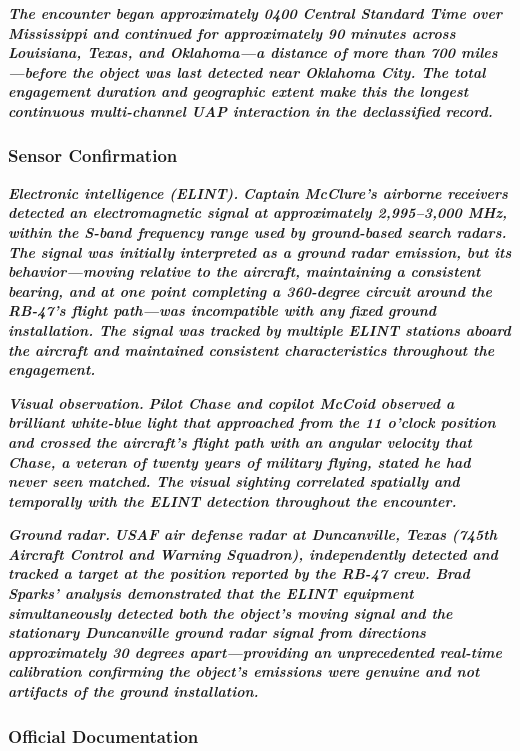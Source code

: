 \documentclass[11pt,letterpaper]{article}
\begin{document}
\textbf{\textit{The encounter began approximately 0400 Central Standard Time over Mississippi and continued for approximately 90 minutes across Louisiana, Texas, and Oklahoma---a distance of more than 700 miles---before the object was last detected near Oklahoma City. The total engagement duration and geographic extent make this the longest continuous multi-channel UAP interaction in the declassified record.}}


\subsubsection{Sensor Confirmation}

\textbf{\textit{Electronic intelligence (ELINT).}}\textbf{\textit{ Captain McClure's airborne receivers detected an electromagnetic signal at approximately 2,995--3,000 MHz, within the S-band frequency range used by ground-based search radars. The signal was initially interpreted as a ground radar emission, but its behavior---moving relative to the aircraft, maintaining a consistent bearing, and at one point completing a 360-degree circuit around the RB-47's flight path---was incompatible with any fixed ground installation. The signal was tracked by multiple ELINT stations aboard the aircraft and maintained consistent characteristics throughout the engagement.}}


\textbf{\textit{Visual observation.}}\textbf{\textit{ Pilot Chase and copilot McCoid observed a brilliant white-blue light that approached from the 11 o'clock position and crossed the aircraft's flight path with an angular velocity that Chase, a veteran of twenty years of military flying, stated he had never seen matched. The visual sighting correlated spatially and temporally with the ELINT detection throughout the encounter.}}


\textbf{\textit{Ground radar.}}\textbf{\textit{ USAF air defense radar at Duncanville, Texas (745th Aircraft Control and Warning Squadron), independently detected and tracked a target at the position reported by the RB-47 crew. Brad Sparks' analysis demonstrated that the ELINT equipment simultaneously detected both the object's moving signal and the stationary Duncanville ground radar signal from directions approximately 30 degrees apart---providing an unprecedented real-time calibration confirming the object's emissions were genuine and not artifacts of the ground installation.}}


\subsubsection{Official Documentation}
\end{document}
